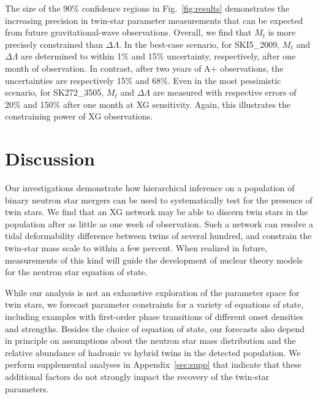 \documentclass[aps,prd,twocolumn,superscriptaddress,nofootinbib]{revtex4-1}
\begin{document}
The size of the 90\% confidence regions in Fig.~\ref{fig:results} demonstrates the increasing precision in twin-star parameter measurements that can be expected from future gravitational-wave observations. Overall, we find that $M_t$ is more precisely constrained than $\Delta\Lambda$. In the best-case scenario, for SKI5\_2009, $M_t$ and $\Delta\Lambda$ are determined to within 1\% and 15\% uncertainty, respectively, after one month of observation. In contrast, after two years of A+ observations, the uncertainties are respectively 15\% and 68\%. Even in the most pessimistic scenario, for SK272\_3505, $M_t$ and $\Delta\Lambda$ are measured with respective errors of 20\% and 150\% after one month at XG sensitivity. Again, this illustrates the constraining power of XG observations.

\section{Discussion}

Our investigations demonstrate how hierarchical inference on a population of binary neutron star mergers can be used to systematically test for the presence of twin stars. We find that an XG network may be able to discern twin stars in the population after as little as one week of observation. Such a network can resolve a tidal deformability difference between twins of several hundred, and constrain the twin-star mass scale to within a few percent. When realized in future, measurements of this kind will guide the development of nuclear theory models for the neutron star equation of state.

While our analysis is not an exhaustive exploration of the parameter space for twin stars, we forecast parameter constraints for a variety of equations of state, including examples with first-order phase transitions of different onset densities and strengths. Besides the choice of equation of state, our forecasts also depend in principle on assumptions about the neutron star mass distribution and the relative abundance of hadronic vs hybrid twins in the detected population. We perform supplemental analyses in Appendix~\ref{sec:supp} that indicate that these additional factors do not strongly impact the recovery of the twin-star parameters.
\end{document}
